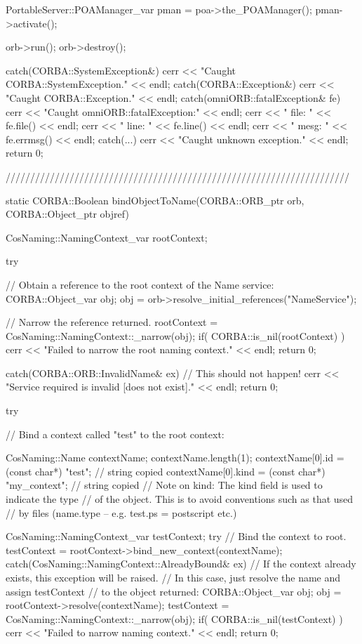 \documentclass[11pt,twoside,a4paper]{book}
\begin{document}
\begin{cxxlisting}
{{    PortableServer::POAManager_var pman = poa->the_POAManager();
    pman->activate();

    orb->run();
    orb->destroy();
  }
  catch(CORBA::SystemException&) {
    cerr << "Caught CORBA::SystemException." << endl;
  }
  catch(CORBA::Exception&) {
    cerr << "Caught CORBA::Exception." << endl;
  }
  catch(omniORB::fatalException& fe) {
    cerr << "Caught omniORB::fatalException:" << endl;
    cerr << "  file: " << fe.file() << endl;
    cerr << "  line: " << fe.line() << endl;
    cerr << "  mesg: " << fe.errmsg() << endl;
  }
  catch(...) {
    cerr << "Caught unknown exception." << endl;
  }
  return 0;
}

//////////////////////////////////////////////////////////////////////

static CORBA::Boolean
bindObjectToName(CORBA::ORB_ptr orb, CORBA::Object_ptr objref)
{
  CosNaming::NamingContext_var rootContext;

  try {
    // Obtain a reference to the root context of the Name service:
    CORBA::Object_var obj;
    obj = orb->resolve_initial_references("NameService");

    // Narrow the reference returned.
    rootContext = CosNaming::NamingContext::_narrow(obj);
    if( CORBA::is_nil(rootContext) ) {
      cerr << "Failed to narrow the root naming context." << endl;
      return 0;
    }
  }
  catch(CORBA::ORB::InvalidName& ex) {
    // This should not happen!
    cerr << "Service required is invalid [does not exist]." << endl;
    return 0;
  }

  try {
    // Bind a context called "test" to the root context:

    CosNaming::Name contextName;
    contextName.length(1);
    contextName[0].id   = (const char*) "test";       // string copied
    contextName[0].kind = (const char*) "my_context"; // string copied
    // Note on kind: The kind field is used to indicate the type
    // of the object. This is to avoid conventions such as that used
    // by files (name.type -- e.g. test.ps = postscript etc.)

    CosNaming::NamingContext_var testContext;
    try {
      // Bind the context to root.
      testContext = rootContext->bind_new_context(contextName);
    }
    catch(CosNaming::NamingContext::AlreadyBound& ex) {
      // If the context already exists, this exception will be raised.
      // In this case, just resolve the name and assign testContext
      // to the object returned:
      CORBA::Object_var obj;
      obj = rootContext->resolve(contextName);
      testContext = CosNaming::NamingContext::_narrow(obj);
      if( CORBA::is_nil(testContext) ) {
        cerr << "Failed to narrow naming context." << endl;
        return 0;
      }
    }

}}
\end{cxxlisting}
\end{document}
